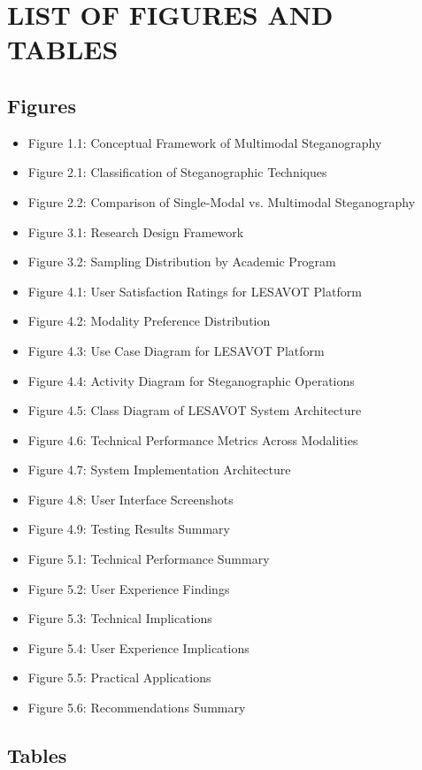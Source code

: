 \documentclass[12pt, a4paper, oneside]{book}
\begin{document}
\chapter{LIST OF FIGURES AND TABLES}

\section*{Figures}

\begin{itemize}
    \item Figure 1.1: Conceptual Framework of Multimodal Steganography
    \item Figure 2.1: Classification of Steganographic Techniques
    \item Figure 2.2: Comparison of Single-Modal vs. Multimodal Steganography
    \item Figure 3.1: Research Design Framework
    \item Figure 3.2: Sampling Distribution by Academic Program
    \item Figure 4.1: User Satisfaction Ratings for LESAVOT Platform
    \item Figure 4.2: Modality Preference Distribution
    \item Figure 4.3: Use Case Diagram for LESAVOT Platform
    \item Figure 4.4: Activity Diagram for Steganographic Operations
    \item Figure 4.5: Class Diagram of LESAVOT System Architecture
    \item Figure 4.6: Technical Performance Metrics Across Modalities
    \item Figure 4.7: System Implementation Architecture
    \item Figure 4.8: User Interface Screenshots
    \item Figure 4.9: Testing Results Summary
    \item Figure 5.1: Technical Performance Summary
    \item Figure 5.2: User Experience Findings
    \item Figure 5.3: Technical Implications
    \item Figure 5.4: User Experience Implications
    \item Figure 5.5: Practical Applications
    \item Figure 5.6: Recommendations Summary
\end{itemize}

\section*{Tables}
\end{document}
